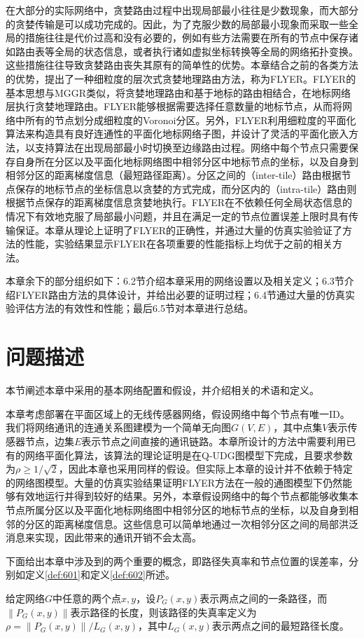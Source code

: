在大部分的实际网络中，贪婪路由过程中出现局部最小往往是少数现象，而大部分的贪婪传输是可以成功完成的。因此，为了克服少数的局部最小现象而采取一些全局的措施往往是代价过高和没有必要的，例如有些方法需要在所有的节点中保存诸如路由表等全局的状态信息，或者执行诸如虚拟坐标转换等全局的网络拓扑变换。这些措施往往导致贪婪路由丧失其原有的简单性的优势。本章结合之前的各类方法的优势，提出了一种细粒度的层次式贪婪地理路由方法，称为FLYER。FLYER的基本思想与MGGR类似，将贪婪地理路由和基于地标的路由相结合，在地标网络层执行贪婪地理路由。FLYER能够根据需要选择任意数量的地标节点，从而将网络中所有的节点划分成细粒度的Voronoi分区。另外，FLYER利用细粒度的平面化算法来构造具有良好连通性的平面化地标网络子图，并设计了灵活的平面化嵌入方法，以支持算法在出现局部最小时切换至边缘路由过程。网络中每个节点只需要保存自身所在分区以及平面化地标网络图中相邻分区中地标节点的坐标，以及自身到相邻分区的距离梯度信息（最短路径距离）。分区之间的（inter-tile）路由根据节点保存的地标节点的坐标信息以贪婪的方式完成，而分区内的（intra-tile）路由则根据节点保存的距离梯度信息贪婪地执行。FLYER在不依赖任何全局状态信息的情况下有效地克服了局部最小问题，并且在满足一定的节点位置误差上限时具有传输保证。本章从理论上证明了FLYER的正确性，并通过大量的仿真实验验证了方法的性能，实验结果显示FLYER在各项重要的性能指标上均优于之前的相关方法。

本章余下的部分组织如下：6.2节介绍本章采用的网络设置以及相关定义；6.3节介绍FLYER路由方法的具体设计，并给出必要的证明过程；6.4节通过大量的仿真实验评估方法的有效性和性能；最后6.5节对本章进行总结。
\section{问题描述}
本节阐述本章中采用的基本网络配置和假设，并介绍相关的术语和定义。

本章考虑部署在平面区域上的无线传感器网络，假设网络中每个节点有唯一ID。我们将网络通讯的连通关系图建模为一个简单无向图$G(V,E)$，其中点集$V$表示传感器节点，边集$E$表示节点之间直接的通讯链路。本章所设计的方法中需要利用已有的网络平面化算法，该算法的理论证明是在Q-UDG图模型下完成，且要求参数为$\rho\ge1/\sqrt{2}$，因此本章也采用同样的假设。但实际上本章的设计并不依赖于特定的网络图模型。大量的仿真实验结果证明FLYER方法在一般的通图模型下仍然能够有效地运行并得到较好的结果。另外，本章假设网络中的每个节点都能够收集本节点所属分区以及平面化地标网络图中相邻分区的地标节点的坐标，以及自身到相邻的分区的距离梯度信息。这些信息可以简单地通过一次相邻分区之间的局部洪泛消息来实现，因此带来的通讯开销不会太高。

下面给出本章中涉及到的两个重要的概念，即路径失真率和节点位置的误差率，分别如定义\ref{def:601}和定义\ref{def:602}所述。
\begin{definition}\label{def:601}
给定网络$G$中任意的两个点$x,y$，设$P_G(x,y)$表示两点之间的一条路径，而$\|P_G(x,y)\|$表示路径的长度，则该路径的失真率定义为$\rho=\|P_G(x,y)\|/L_G(x,y)$，其中$L_G(x,y)$表示两点之间的最短路径长度。
\end{definition}

